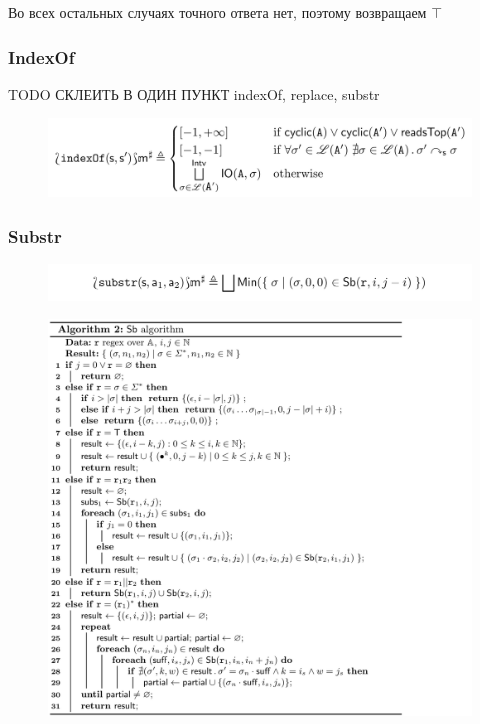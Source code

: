 Во всех остальных случаях точного ответа нет, поэтому возвращаем $\top$

\newpage
\subsubsection*{IndexOf}

TODO СКЛЕИТЬ В ОДИН ПУНКТ indexOf, replace, substr

\begin{figure}[H]
\includegraphics[width=\textwidth]{images/tarsis-indexOf.png}\hfill
\end{figure}

\newpage
\subsubsection*{Substr}
\begin{figure}[H]
\includegraphics[width=\textwidth]{images/tarsis-substr.png}\hfill
\end{figure}

\begin{figure}[H]
\includegraphics[width=\textwidth]{images/tarsis-SB-algo.png}\hfill
\end{figure}


